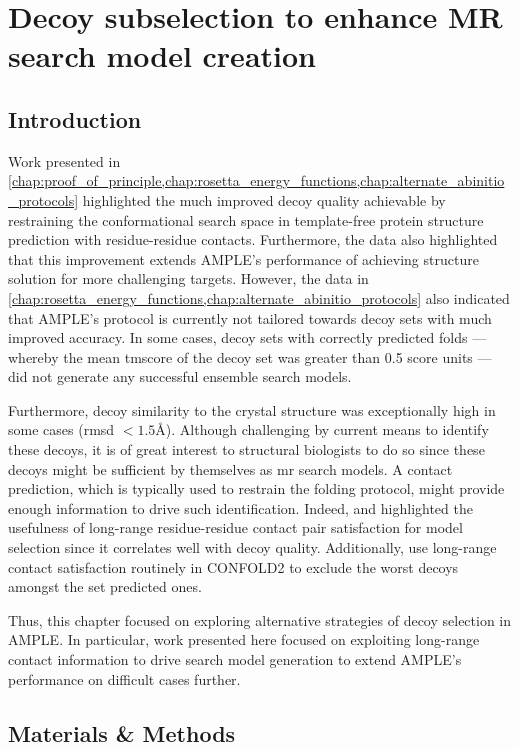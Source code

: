 \chapter{Decoy subselection to enhance MR search model creation} \label{chap:ample_decoys}
\clearpage

\section{Introduction}
Work presented in \cref{chap:proof_of_principle,chap:rosetta_energy_functions,chap:alternate_abinitio_protocols} highlighted the much improved decoy quality achievable by restraining the conformational search space in template-free protein structure prediction with residue-residue contacts. Furthermore, the data also highlighted that this improvement extends AMPLE's performance of achieving structure solution for more challenging targets. However, the data in \cref{chap:rosetta_energy_functions,chap:alternate_abinitio_protocols} also indicated that AMPLE's protocol is currently not tailored towards decoy sets with much improved accuracy. In some cases, decoy sets with correctly predicted folds --- whereby the mean \gls{tmscore} of the decoy set was greater than 0.5 score units --- did not generate any successful ensemble search models.

Furthermore, decoy similarity to the crystal structure was exceptionally high in some cases (\gls{rmsd} $<1.5$\AA). Although challenging by current means to identify these decoys, it is of great interest to structural biologists to do so since these decoys might be sufficient by themselves as \gls{mr} search models. A contact prediction, which is typically used to restrain the folding protocol, might provide enough information to drive such identification. Indeed, \textcite{Kosciolek2014-bt} and \textcite{De_Oliveira2016-gj} highlighted the usefulness of long-range residue-residue contact pair satisfaction for model selection since it correlates well with decoy quality. Additionally, \textcite{Adhikari2018-lj} use long-range contact satisfaction routinely in CONFOLD2 to exclude the worst decoys amongst the set predicted ones.

Thus, this chapter focused on exploring alternative strategies of decoy selection in AMPLE. In particular, work presented here focused on exploiting long-range contact information to drive search model generation to extend AMPLE's performance on difficult cases further.

\section{Materials \& Methods}

